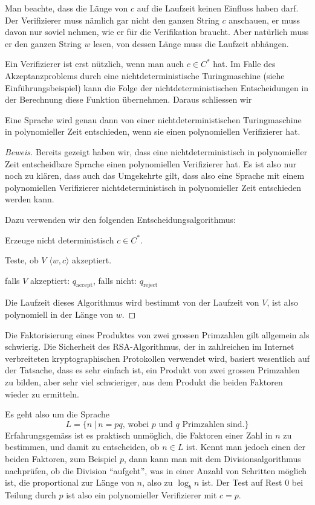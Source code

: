 Man beachte, dass die Länge von $c$ auf die Laufzeit keinen
Einfluss haben darf. Der Verifizierer muss nämlich gar nicht
den ganzen String $c$ anschauen, er muss davon nur soviel
nehmen, wie er für die Verifikation braucht. Aber natürlich
muss er den ganzen String $w$ lesen, von dessen Länge muss
die Laufzeit abhängen.

Ein Verifizierer ist erst nützlich, wenn man auch $c\in C^*$
hat. Im Falle des Akzeptanzproblems durch eine nichtdeterministische
Turingmaschine (siehe Einführungsbeispiel) kann die Folge der
nichtdeterministischen Entscheidungen in der Berechnung diese
Funktion übernehmen. Daraus schliessen wir

\begin{satz} Eine Sprache wird genau dann von einer
nichtdeterministischen Turingmaschine in polynomieller Zeit entschieden,
wenn sie einen polynomiellen Verifizierer hat.
\end{satz}

\begin{proof}[Beweis]
Bereits gezeigt haben wir, dass eine nichtdeterministisch in
polynomieller Zeit entscheidbare Sprache einen polynomiellen Verifizierer hat.
Es ist also
nur noch zu klären, dass auch das Umgekehrte gilt, dass also eine
Sprache mit einem polynomiellen Verifizierer nichtdeterministisch
in polynomieller Zeit entschieden werden kann.

Dazu verwenden wir den folgenden Entscheidungsalgorithmus:
\begin{compactenum}
\item Erzeuge nicht deterministisch $c\in C^*$.
\item Teste, ob $V$ $\langle w,c\rangle$ akzeptiert.
\item falls $V$ akzeptiert: $q_{\text{accept}}$, falls nicht:
$q_{\text{reject}}$
\end{compactenum}
Die Laufzeit dieses Algorithmus wird bestimmt von der Laufzeit von $V$,
ist also polynomiell in der Länge von $w$.
\end{proof}

\begin{beispiel}[Faktorisierung]
Die Faktorisierung eines Produktes von zwei grossen Primzahlen
gilt allgemein als schwierig. Die Sicherheit des RSA-Algorithmus,
der in zahlreichen im Internet verbreiteten kryptographischen
Protokollen verwendet wird, basiert wesentlich auf der Tatsache, dass
es sehr einfach ist, ein Produkt von zwei grossen Primzahlen zu
bilden, aber sehr viel schwieriger, aus dem Produkt die beiden
Faktoren wieder zu ermitteln.

Es geht also um die Sprache
\[
L
=
\{
n\;|\,\text{$n=pq$, wobei $p$ und $q$ Primzahlen sind}.
\}
\]
Erfahrungsgemäss ist es praktisch unmöglich, die Faktoren
einer Zahl in $n$ zu bestimmen, und damit zu entscheiden, ob
$n\in L$ ist. Kennt man jedoch einen der beiden Faktoren,
zum Beispiel $p$, dann kann man mit dem Divisionsalgorithmus
nachprüfen, ob die Division ``aufgeht'', was in einer Anzahl
von Schritten möglich ist, die proportional zur Länge von 
$n$, also zu $\log_b n$ ist. Der Test auf Rest 0 bei Teilung
durch $p$ ist also ein polynomieller Verifizierer mit $c=p$.
\end{beispiel}

